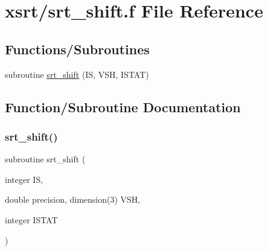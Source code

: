 \hypertarget{srt__shift_8f}{}\section{xsrt/srt\+\_\+shift.f File Reference}
\label{srt__shift_8f}
\subsection*{Functions/\+Subroutines}
\begin{DoxyCompactItemize}
\item 
subroutine \hyperlink{srt__shift_8f_a1fee67dc23840dc863d8f20e1f5de5b3}{srt\+\_\+shift} (IS, V\+SH, I\+S\+T\+AT)
\end{DoxyCompactItemize}


\subsection{Function/\+Subroutine Documentation}
\mbox{\label{srt__shift_8f_a1fee67dc23840dc863d8f20e1f5de5b3}} 
\subsubsection{\texorpdfstring{srt\+\_\+shift()}{srt\_shift()}}
{\footnotesize\ttfamily subroutine srt\+\_\+shift (\begin{DoxyParamCaption}\item[{integer}]{IS,  }\item[{double precision, dimension(3)}]{V\+SH,  }\item[{integer}]{I\+S\+T\+AT }\end{DoxyParamCaption})}

